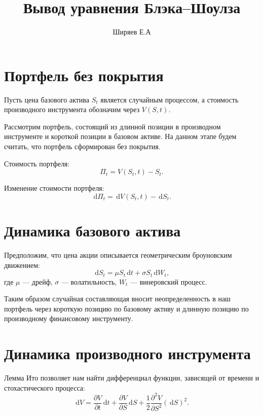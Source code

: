 \documentclass[12pt]{article}
\title{Вывод уравнения Блэка--Шоулза}
\author{Ширяев Е.А}
\date{}
\newcommand{\dd}{\,\mathrm{d}}
\newcommand{\pd}[2]{\frac{\partial #1}{\partial #2}}
\newcommand{\pdd}[2]{\frac{\partial^2 #1}{\partial #2^2}}
\begin{document}
\maketitle

\section{Портфель без покрытия}

Пусть цена базового актива $S_t$ является случайным процессом,
а стоимость производного инструмента обозначим через $V(S,t)$.

Рассмотрим портфель, состоящий из длинной позиции в производном инструменте
и короткой позиции в базовом активе. На данном этапе будем считать,
что портфель сформирован без покрытия.

Стоимость портфеля:
\begin{equation}
\Pi_t = V(S_t,t) - S_t.
\end{equation}

Изменение стоимости портфеля:
\begin{equation}
\dd \Pi_t = \dd V(S_t,t) - \dd S_t.
\end{equation}

\section{Динамика базового актива}

Предположим, что цена акции описывается геометрическим броуновским движением:
\begin{equation}
\dd S_t = \mu S_t \dd t + \sigma S_t \dd W_t,
\end{equation}
где $\mu$ --- дрейф, $\sigma$ --- волатильность,
$W_t$ --- винеровский процесс.

Таким образом случайная составляющая вносит неопределенность в наш портфель через
короткую позицию по базовому активу и длинную позицию по производному финансовому
инструменту.

\section{Динамика производного инструмента}

Лемма Ито позволяет нам найти дифференциал функции, зависящей от времени
и стохастического процесса:
\begin{equation}
\dd V = \pd{V}{t}\dd t + \pd{V}{S}\dd S + \frac{1}{2}\pdd{V}{S}(\dd S)^2.
\end{equation}
\end{document}
